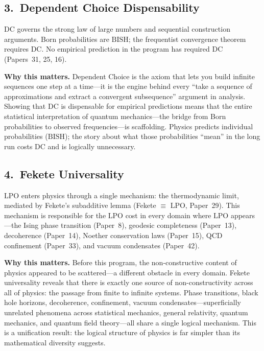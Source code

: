 \documentclass[11pt,a4paper]{report}
\theoremstyle{plain}
\theoremstyle{definition}
\theoremstyle{remark}
\newcommand{\BISH}{\mathrm{BISH}}
\newcommand{\LPO}{\mathrm{LPO}}
\newcommand{\DC}{\mathrm{DC}}
\begin{document}
\subsection*{3.\ Dependent Choice Dispensability}

$\DC$ governs the strong law of large numbers and sequential construction arguments.  Born probabilities are $\BISH$; the frequentist convergence theorem requires $\DC$.  No empirical prediction in the program has required $\DC$ (Papers~31, 25, 16).

\medskip\noindent
\textbf{Why this matters.}\quad
Dependent Choice is the axiom that lets you build infinite sequences one step at a time---it is the engine behind every ``take a sequence of approximations and extract a convergent subsequence'' argument in analysis.  Showing that $\DC$ is dispensable for empirical predictions means that the entire statistical interpretation of quantum mechanics---the bridge from Born probabilities to observed frequencies---is scaffolding.  Physics predicts individual probabilities ($\BISH$); the story about what those probabilities ``mean'' in the long run costs $\DC$ and is logically unnecessary.

\subsection*{4.\ Fekete Universality}

$\LPO$ enters physics through a single mechanism: the thermodynamic limit, mediated by Fekete's subadditive lemma (Fekete $\equiv$ $\LPO$, Paper~29).  This mechanism is responsible for the $\LPO$ cost in every domain where $\LPO$ appears---the Ising phase transition (Paper~8), geodesic completeness (Paper~13), decoherence (Paper~14), Noether conservation laws (Paper~15), QCD confinement (Paper~33), and vacuum condensates (Paper~42).

\medskip\noindent
\textbf{Why this matters.}\quad
Before this program, the non-constructive content of physics appeared to be scattered---a different obstacle in every domain.  Fekete universality reveals that there is exactly one source of non-constructivity across all of physics: the passage from finite to infinite systems.  Phase transitions, black hole horizons, decoherence, confinement, vacuum condensates---superficially unrelated phenomena across statistical mechanics, general relativity, quantum mechanics, and quantum field theory---all share a single logical mechanism.  This is a unification result: the logical structure of physics is far simpler than its mathematical diversity suggests.
\end{document}

